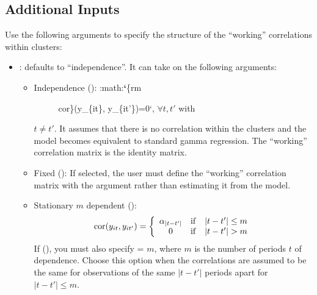 \documentclass[letterpaper,10pt,english]{sphinxmanual}
\begin{document}
\subsection{Additional Inputs}
\label{vignette:id119}
Use the following arguments to specify the structure of the “working”
correlations within clusters:
\begin{itemize}
\item {} 
: defaults to “independence”. It can take on the following
arguments:
\begin{itemize}
\item {} \begin{description}
\item[{Independence (): :math:{\color{red}\bfseries{}{}`}\{rm}] \leavevmode
cor\}(y\_\{it\}, y\_\{it'\})=0{}`, \(\forall t, t'\) with

\end{description}

\(t\ne t'\). It assumes that there is no correlation within
the clusters and the model becomes equivalent to standard gamma
regression. The “working” correlation matrix is the identity
matrix.

\item {} 
Fixed (): If selected, the user must define the
“working” correlation matrix with the  argument rather than
estimating it from the model.

\item {} 
Stationary \(m\) dependent ():
\begin{gather}
\begin{split}{\rm cor}(y_{it}, y_{it'})=\left\{\begin{array}{ccc}
      \alpha_{|t-t'|} & {\rm if} & |t-t'|\le m \\ 0 & {\rm if}
      & |t-t'| > m
    \end{array}\right.\end{split}\notag
\end{gather}
If (), you must also specify  =
\(m\), where \(m\) is the number of periods \(t\) of
dependence. Choose this option when the correlations are assumed
to be the same for observations of the same \(|t-t'|\) periods
apart for \(|t-t'| \leq m\).



\end{itemize}
\end{itemize}
\end{document}
